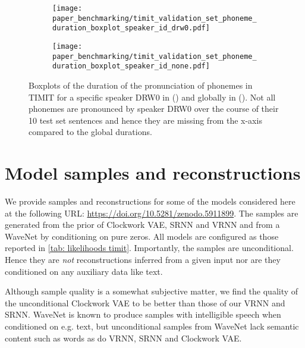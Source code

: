 {\begin{figure}[t!]
    \centering
    \hfill
    \begin{subfigure}[b]{\textwidth}
        \centering
        \texttt{[image: paper\_benchmarking/timit\_validation\_set\_phoneme\_duration\_boxplot\_speaker\_id\_drw0.pdf]}
        \caption{}
        \label{fig: timit validation set phoneme duration DRW0}
    \end{subfigure}
    \begin{subfigure}[b]{\textwidth}
        \centering
        \texttt{[image: paper\_benchmarking/timit\_validation\_set\_phoneme\_duration\_boxplot\_speaker\_id\_none.pdf]}
        \caption{}
        \label{fig: timit validation set phoneme duration global}
    \end{subfigure}
    \caption[Boxplots of duration of phoneme pronunciation in TIMIT]{Boxplots of the duration of the pronunciation of phonemes in TIMIT for a specific speaker DRW0 in () and globally in (). Not all phonemes are pronounced by speaker DRW0 over the course of their 10 test set sentences and hence they are missing from the x-axis compared to the global durations.}
    \label{fig: timit validation set phoneme duration}
\end{figure}

\section{Model samples and reconstructions}\label{app: model samples and reconstructions}
We provide samples and reconstructions for some of the models considered here at the following URL: \url{https://doi.org/10.5281/zenodo.5911899}.
The samples are generated from the prior of Clockwork VAE, SRNN and VRNN and from a WaveNet by conditioning on pure zeros. All models are configured as those reported in \cref{tab: likelihoods timit}.
Importantly, the samples are unconditional. Hence they are \emph{not} reconstructions inferred from a given input nor are they conditioned on any auxiliary data like text.

Although sample quality is a somewhat subjective matter, we find the quality of the unconditional Clockwork VAE to be better than those of our VRNN and SRNN. WaveNet is known to produce samples with intelligible speech when conditioned on e.g. text, but unconditional samples from WaveNet lack semantic content such as words as do VRNN, SRNN and Clockwork VAE.

}